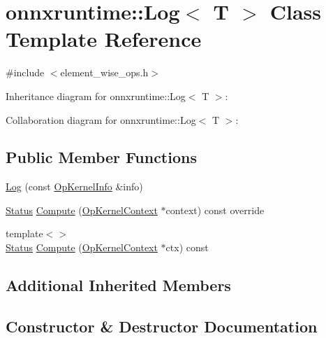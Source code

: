 \hypertarget{classonnxruntime_1_1Log}{}\section{onnxruntime\+:\+:Log$<$ T $>$ Class Template Reference}
\label{classonnxruntime_1_1Log}


{\ttfamily \#include $<$element\+\_\+wise\+\_\+ops.\+h$>$}



Inheritance diagram for onnxruntime\+:\+:Log$<$ T $>$\+:


Collaboration diagram for onnxruntime\+:\+:Log$<$ T $>$\+:
\subsection*{Public Member Functions}
\begin{DoxyCompactItemize}
\item 
\mbox{\hyperlink{classonnxruntime_1_1Log_ae313944a06a7215c745990ef998e259c}{Log}} (const \mbox{\hyperlink{classonnxruntime_1_1OpKernelInfo}{Op\+Kernel\+Info}} \&info)
\item 
\mbox{\hyperlink{classonnxruntime_1_1common_1_1Status}{Status}} \mbox{\hyperlink{classonnxruntime_1_1Log_a41efdf9271b5b737c8809e5447f32334}{Compute}} (\mbox{\hyperlink{classonnxruntime_1_1OpKernelContext}{Op\+Kernel\+Context}} $\ast$context) const override
\item 
{\footnotesize template$<$$>$ }\\\mbox{\hyperlink{classonnxruntime_1_1common_1_1Status}{Status}} \mbox{\hyperlink{classonnxruntime_1_1Log_aeb014ad0f4b041d1b008e0d6fc67a80a}{Compute}} (\mbox{\hyperlink{classonnxruntime_1_1OpKernelContext}{Op\+Kernel\+Context}} $\ast$ctx) const
\end{DoxyCompactItemize}
\subsection*{Additional Inherited Members}


\subsection{Constructor \& Destructor Documentation}
\mbox{\label{classonnxruntime_1_1Log_ae313944a06a7215c745990ef998e259c}} 
